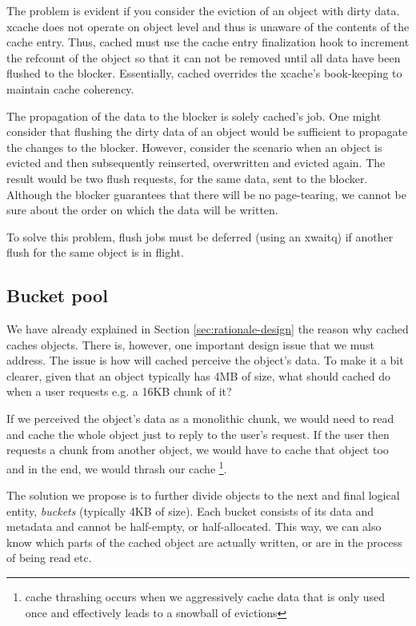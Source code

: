The problem is evident if you consider the eviction of an object with dirty 
data. xcache does not operate on object level and thus is unaware of the 
contents of the cache entry. Thus, cached must use the cache entry finalization 
hook to increment the refcount of the object so that it can not be removed 
until all data have been flushed to the blocker. Essentially, cached overrides 
the xcache's book-keeping to maintain cache coherency.

The propagation of the data to the blocker is solely cached's job. One might 
consider that flushing the dirty data of an object would be sufficient to 
propagate the changes to the blocker. However, consider the scenario when an 
object is evicted and then subsequently reinserted, overwritten and evicted 
again. The result would be two flush requests, for the same data, sent to the 
blocker. Although the blocker guarantees that there will be no page-tearing, we 
cannot be sure about the order on which the data will be written.

To solve this problem, flush jobs must be deferred (using an xwaitq) if another 
flush for the same object is in flight. 

\subsection{Bucket pool}


We have already explained in Section \ref{sec:rationale-design} the reason why 
cached caches objects. There is, however, one important design issue that we 
must address. The issue is how will cached perceive the object's data. To make 
it a bit clearer, given that an object typically has 4MB of size, what should 
cached do when a user requests e.g. a 16KB chunk of it?

If we perceived the object's data as a monolithic chunk, we would need to read 
and cache the whole object just to reply to the user's request. If the user 
then requests a chunk from another object, we would have to cache that object 
too and in the end, we would thrash our cache
\footnote{
	cache thrashing occurs when we aggressively cache data that is only 
	used once and effectively leads to a snowball of evictions
}.

The solution we propose is to further divide objects to the next and final 
logical entity, \emph{buckets} (typically 4KB of size). Each bucket consists of 
its data and metadata and cannot be half-empty, or half-allocated. This way, we 
can also know which parts of the cached object are actually written, or are in 
the process of being read etc.

